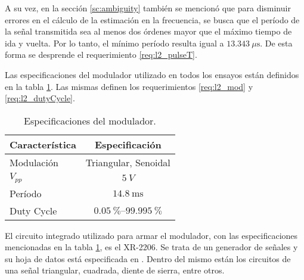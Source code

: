 A su vez, en la sección \ref{sc:ambiguity} también se mencionó que para disminuir errores en el cálculo de la estimación en la frecuencia, se busca que el período de la señal transmitida sea al menos dos órdenes mayor que el máximo tiempo de ida y vuelta. Por lo tanto, el mínimo período resulta igual a $\SI{13.343}{\mu\second}$. De esta forma se desprende el requerimiento \ref{req:l2_pulseT}.

Las especificaciones del modulador utilizado en todos los ensayos están definidos en la tabla \ref{tab:modulatorsSpecification}. Las mismas definen los requerimientos \ref{req:l2_mod} y \ref{req:l2_dutyCycle}.

\begin{table}[htb]
  \caption{Especificaciones del modulador.}
  \centering
  \label{tab:modulatorsSpecification}
  \begin{tabular}{l c}
  \toprule
  \textbf{Característica} & \textbf{Especificación} \tabularnewline
  \midrule

  Modulación & Triangular, Senoidal \tabularnewline

  $V_{pp}$ & $\SI{5}{V}$ \tabularnewline

  Período & $\SI{14.8}{\milli\second}$ \tabularnewline

  Duty Cycle & $\SIrange[range-phrase = \rightarrow]{0.05}{99.995}{\percent}$ \tabularnewline

  \bottomrule
  \end{tabular}
\end{table}

El circuito integrado utilizado para armar el modulador, con las especificaciones mencionadas en la tabla \ref{tab:modulatorsSpecification}, es el XR-2206. Se trata de un generador de señales y su hoja de datos está especificada en \cite{Generator1972}. Dentro del mismo están los circuitos de una señal triangular, cuadrada, diente de sierra, entre otros.


